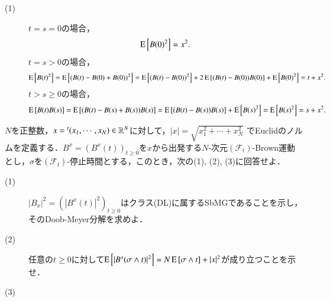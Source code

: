 \begin{prf}
\begin{description}\mbox{}
	\item[(1)] 
		$t = s = 0$の場合，
		\begin{align}
			\operatorname{E} \left[ B(0)^2 \right] = x^2.
		\end{align}
		$t = s > 0$の場合，
		\begin{align}
			\operatorname{E} \left[ B(t)^2 \right] = \operatorname{E} \left[ (B(t) - B(0) + B(0))^2 \right] = \operatorname{E} \left[ (B(t) - B(0))^2 \right] + 2\operatorname{E} \left[ (B(t) - B(0))B(0) \right] + \operatorname{E} \left[ B(0)^2 \right] = t + x^2.
		\end{align}
		$t > s \geq 0$の場合，
		\begin{align}
			\operatorname{E} \left[ B(t)B(s) \right] = \operatorname{E} \left[ (B(t) - B(s) + B(s))B(s) \right] = \operatorname{E} \left[ (B(t) - B(s))B(s) \right] + \operatorname{E} \left[ B(s)^2 \right] = \operatorname{E} \left[ B(s)^2 \right] =  s + x^2.
		\end{align}
\end{description}
\end{prf}

$N$を正整数，$x = {}^t(x_1,\cdots,x_N) \in \mathbb{R}^N$に対して，$|x| = \sqrt{x_1^2 + \cdots + x_N^2}$
でEuclidのノルムを定義する．$B^x = \left(B^x(t)\right)_{t \geq 0}$を$x$から出発する$N$-次元$(\mathcal{F}_t)$-Brown運動
とし，$\sigma$を$(\mathcal{F}_t)$-停止時間とする，このとき，次の(1), (2), (3)に回答せよ．
\begin{description}
	\item[(1)] $|B_x|^2 = \left(\left|B^x(t)\right|^2\right)_{t \geq 0}$はクラス(DL)に属するSbMGであることを示し，
		そのDoob-Meyer分解を求めよ．
	\item[(2)] 任意の$t \geq 0$に対して$\operatorname{E} \left[ |B^x(\sigma \wedge t)|^2 \right] = N\operatorname{E} \left[ \sigma \wedge t \right] + |x|^2$が成り立つことを示せ．
	\item[(3)]
\end{description}

